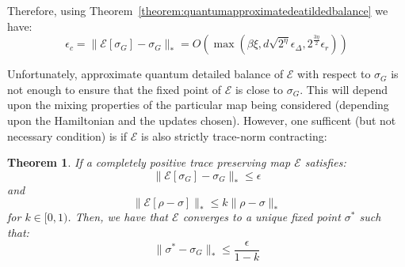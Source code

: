\documentclass[aps,floatfix,10pt,amssymb,amsfont,amsmath,superscriptaddress,float,nofootinbib,longbibliography,nobalancelastpage,twocolumn]{revtex4-2}
\newtheorem{theorem}{Theorem}
\begin{document}
\begin{widetext}
Therefore, using Theorem~\ref{theorem:quantumapproximatedeatildedbalance} we have:
 \begin{equation}
   \epsilon_c = \|\mathcal{E}[\sigma_G] - \sigma_G\|_* = O(\max(\beta \xi, d \sqrt{2^{\eta}}\epsilon_{\Delta}, 2^{\frac{3\eta}{2}}\epsilon_r))
    \label{eq:error_bound}
\end{equation}
\end{widetext}
 Unfortunately, approximate quantum detailed balance of $\mathcal{E}$ with respect to $\sigma_G$ is not enough to ensure that the fixed point of $\mathcal{E}$ is close to $\sigma_G$. This will depend upon the mixing properties of the particular map being considered (depending upon the Hamiltonian and the updates chosen). However, one sufficent (but not necessary condition) is if $\mathcal{E}$ is also strictly trace-norm contracting:
 \begin{theorem}
     If a completely positive trace preserving map $\mathcal{E}$ satisfies:
     \begin{equation}
         \|\mathcal{E}[\sigma_G] - \sigma_G\|_* \leq \epsilon
     \end{equation}
     and
 \begin{equation}
     \|\mathcal{E}[\rho-\sigma]\|_* \leq k\|\rho-\sigma\|_*
 \end{equation}
 for $k \in [0,1)$. Then, we have that $\mathcal{E}$ converges to a unique fixed point $\sigma^*$ such that:
 \begin{equation}
     \| \sigma^* -\sigma_G\|_* \leq \frac{\epsilon}{1-k}
 \end{equation}
 \label{theorem:error_bound}
 \end{theorem}
\end{document}
